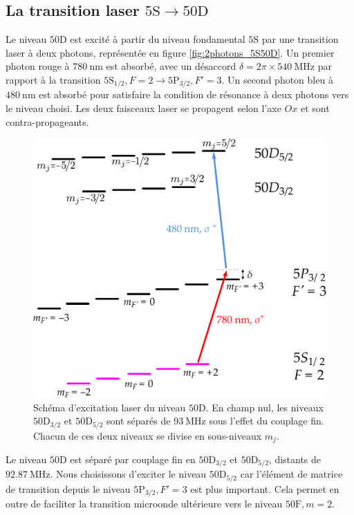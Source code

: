 	\subsection{La transition laser $\mathrm{5S \rightarrow 50D}$}
\noindent Le niveau $\mathrm{50D}$ est excité à partir du niveau fondamental $\mathrm{5S}$ par une transition laser à deux photons, représentée en figure \eqref{fig:2photons_5S50D}.
Un premier photon rouge à $\SI{780}{\nano\meter}$ est absorbé, avec un désaccord $\delta=2\pi\times \SI{540}{\MHz}$ par rapport à la transition $\mathrm{5S_{1/2}},F=2 \rightarrow \mathrm{5P_{3/2}},F'=3$.
Un second photon bleu à $\SI{480}{\nano\meter}$ est absorbé pour satisfaire la condition de résonance à deux photons vers le niveau choisi.
Les deux faisceaux laser se propagent selon l'axe $Ox$ et sont contra-propageants.
		
\begin{figure}[h]
\centering
\includegraphics[width=0.7\linewidth]{figures/circulars/2photons_5S50D}
\caption[Schéma d'excitation laser du niveau $\mathrm{50D}$]{
Schéma d'excitation laser du niveau $\mathrm{50D}$.
En champ nul, les niveaux $\mathrm{50D}_{3/2}$ et $\mathrm{50D}_{5/2}$ sont séparés de $\SI{93}{\MHz}$ sous l'effet du couplage fin.
Chacun de ces deux niveaux se divise en sous-niveaux $m_j$.
}
\label{fig:2photons_5S50D}
\end{figure}

Le niveau $\mathrm{50D}$ est séparé par couplage fin en $\mathrm{50D}_{3/2}$ et $\mathrm{50D}_{5/2}$, distants de $\SI{92.87}{\MHz}$.
Nous choisissons d'exciter le niveau $\mathrm{50D}_{5/2}$ car l'élément de matrice de transition depuis le niveau $\mathrm{5P}_{3/2},F'=3$ est plus important.
Cela permet en outre de faciliter la transition microonde ultérieure vers le niveau $\mathrm{50F},m=2$.

